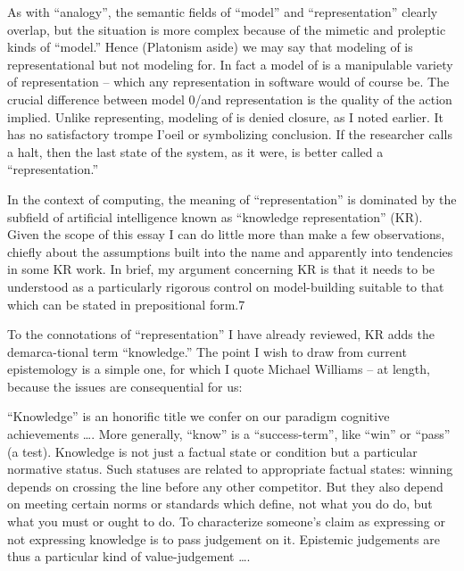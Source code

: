 As with ``analogy'', the semantic fields of ``model'' and
``representation'' clearly overlap, but the situation is more complex
because of the mimetic and proleptic kinds of ``model.'' Hence
(Platonism aside) we may say that modeling of is representational but
not modeling for. In fact a model of is a manipulable variety of
representation -- which any representation in software would of course
be. The crucial difference between model 0/and representation is the
quality of the action implied. Unlike representing, modeling of is
denied closure, as I noted earlier. It has no satisfactory trompe I'oeil
or symbolizing conclusion. If the researcher calls a halt, then the last
state of the system, as it were, is better called a ``representation.''

In the context of computing, the meaning of ``representation'' is
dominated by the subfield of artificial intelligence known as
``knowledge representation'' (KR). Given the scope of this essay I can
do little more than make a few observations, chiefly about the
assumptions built into the name and apparently into tendencies in some
KR work. In brief, my argument concerning KR is that it needs to be
understood as a particularly rigorous control on model-building suitable
to that which can be stated in prepositional form.7

To the connotations of ``representation'' I have already reviewed, KR
adds the demarca-tional term ``knowledge.'' The point I wish to draw
from current epistemology is a simple one, for which I quote Michael
Williams -- at length, because the issues are consequential for us:

``Knowledge'' is an honorific title we confer on our paradigm cognitive
achievements \ldots. More generally, ``know'' is a ``success-term'',
like ``win'' or ``pass'' (a test). Knowledge is not just a factual state
or condition but a particular normative status. Such statuses are
related to appropriate factual states: winning depends on crossing the
line before any other competitor. But they also depend on meeting
certain norms or standards which define, not what you do do, but what
you must or ought to do. To characterize someone's claim as expressing
or not expressing knowledge is to pass judgement on it. Epistemic
judgements are thus a particular kind of value-judgement \ldots.


